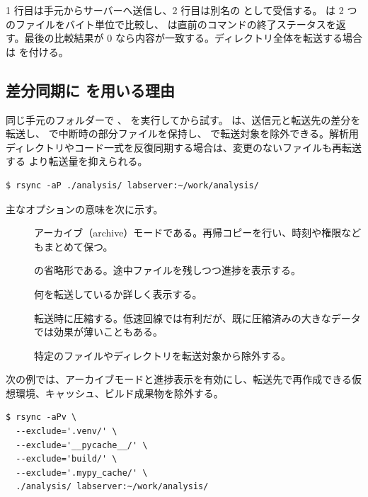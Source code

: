 1 行目は手元からサーバーへ送信し、2 行目は別名の  として受信する。 は 2 つのファイルをバイト単位で比較し、 は直前のコマンドの終了ステータスを返す。最後の比較結果が 0 なら内容が一致する。ディレクトリ全体を転送する場合は  を付ける。

\subsection{差分同期に  を用いる理由}

同じ手元のフォルダーで 、 を実行してから試す。 は、送信元と転送先の差分を転送し、 で中断時の部分ファイルを保持し、 で転送対象を除外できる。解析用ディレクトリやコード一式を反復同期する場合は、変更のないファイルも再転送する  より転送量を抑えられる。

\begin{lstlisting}[numbers=none, xleftmargin=2\zw]
$ rsync -aP ./analysis/ labserver:~/work/analysis/
\end{lstlisting}

主なオプションの意味を次に示す。

\begin{description}
\item[] アーカイブ（archive）モードである。再帰コピーを行い、時刻や権限などもまとめて保つ。
\item[]  の省略形である。途中ファイルを残しつつ進捗を表示する。
\item[] 何を転送しているか詳しく表示する。
\item[] 転送時に圧縮する。低速回線では有利だが、既に圧縮済みの大きなデータでは効果が薄いこともある。
\item[] 特定のファイルやディレクトリを転送対象から除外する。
\end{description}

次の例では、アーカイブモードと進捗表示を有効にし、転送先で再作成できる仮想環境、キャッシュ、ビルド成果物を除外する。

\begin{lstlisting}[numbers=none, xleftmargin=2\zw]
$ rsync -aPv \
  --exclude='.venv/' \
  --exclude='__pycache__/' \
  --exclude='build/' \
  --exclude='.mypy_cache/' \
  ./analysis/ labserver:~/work/analysis/
\end{lstlisting}

